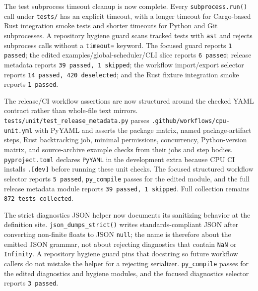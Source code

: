\documentclass[11pt]{article}
\begin{document}
The test subprocess timeout cleanup is now complete.  Every
\texttt{subprocess.run()} call under \texttt{tests/} has an explicit timeout,
with a longer timeout for Cargo-based Rust integration smoke tests and shorter
timeouts for Python and Git subprocesses.  A repository hygiene guard scans
tracked tests with \texttt{ast} and rejects subprocess calls without a
\texttt{timeout=} keyword.  The focused guard reports \texttt{1 passed}; the
edited examples/global-scheduler/CLI slice reports \texttt{6 passed}; release
metadata reports \texttt{39 passed, 1 skipped}; the workflow import/export
selector reports \texttt{14 passed, 420 deselected}; and the Rust fixture
integration smoke reports \texttt{1 passed}.

The release/CI workflow assertions are now structured around the checked YAML
contract rather than whole-file text mirrors.  \texttt{tests/unit/test\_release\_metadata.py}
parses \texttt{.github/workflows/cpu-unit.yml} with PyYAML and asserts the
package matrix, named package-artifact steps, Rust backtracking job, minimal
permissions, concurrency, Python-version matrix, and source-archive example
checks from their jobs and step bodies.  \texttt{pyproject.toml} declares
\texttt{PyYAML} in the development extra because CPU CI installs
\texttt{.[dev]} before running these unit checks.  The focused structured
workflow selector reports \texttt{5 passed}, \texttt{py\_compile} passes for
the edited module, and the full release metadata module reports
\texttt{39 passed, 1 skipped}.  Full collection remains
\texttt{872 tests collected}.

The strict diagnostics JSON helper now documents its sanitizing behavior at the
definition site.  \texttt{json\_dumps\_strict()} writes standards-compliant JSON
after converting non-finite floats to JSON \texttt{null}; the name is therefore
about the emitted JSON grammar, not about rejecting diagnostics that contain
\texttt{NaN} or \texttt{Infinity}.  A repository hygiene guard pins that
docstring so future workflow callers do not mistake the helper for a rejecting
serializer.  \texttt{py\_compile} passes for the edited diagnostics and hygiene
modules, and the focused diagnostics selector reports \texttt{3 passed}.
\end{document}
